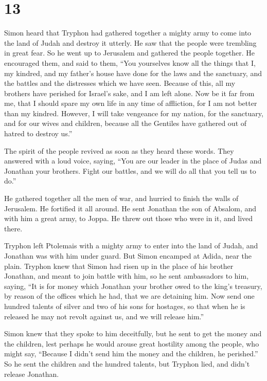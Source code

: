 \hypertarget{section-12}{%
\section{13}\label{section-12}}

 Simon heard that Tryphon had gathered together a mighty
army to come into the land of Judah and destroy it utterly.
 He saw that the people were trembling in great fear. So
he went up to Jerusalem and gathered the people together. 
He encouraged them, and said to them, ``You yourselves know all the
things that I, my kindred, and my father's house have done for the laws
and the sanctuary, and the battles and the distresses which we have
seen.  Because of this, all my brothers have perished for
Israel's sake, and I am left alone.  Now be it far from
me, that I should spare my own life in any time of affliction, for I am
not better than my kindred.  However, I will take
vengeance for my nation, for the sanctuary, and for our wives and
children, because all the Gentiles have gathered out of hatred to
destroy us.''

 The spirit of the people revived as soon as they heard
these words.  They answered with a loud voice, saying,
``You are our leader in the place of Judas and Jonathan your brothers.
 Fight our battles, and we will do all that you tell us to
do.''

 He gathered together all the men of war, and hurried to
finish the walls of Jerusalem. He fortified it all around.
 He sent Jonathan the son of Absalom, and with him a
great army, to Joppa. He threw out those who were in it, and lived
there.

 Tryphon left Ptolemais with a mighty army to enter into
the land of Judah, and Jonathan was with him under guard.
 But Simon encamped at Adida, near the plain.
 Tryphon knew that Simon had risen up in the place of his
brother Jonathan, and meant to join battle with him, so he sent
ambassadors to him, saying,  ``It is for money which
Jonathan your brother owed to the king's treasury, by reason of the
offices which he had, that we are detaining him.  Now
send one hundred talents of silver and two of his sons for hostages, so
that when he is released he may not revolt against us, and we will
release him.''

 Simon knew that they spoke to him deceitfully, but he
sent to get the money and the children, lest perhaps he would arouse
great hostility among the people,  who might say,
``Because I didn't send him the money and the children, he perished.''
 So he sent the children and the hundred talents, but
Tryphon lied, and didn't release Jonathan.

